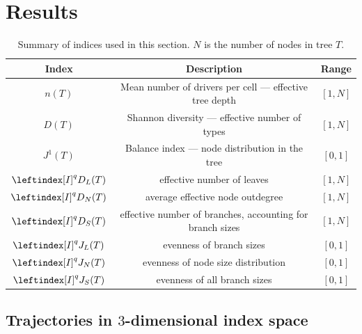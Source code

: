 \section{Results}

\begin{table}[h!]
    \begin{tabular}{|c|c|c|}
        \hline
        Index & Description & Range \\
        \hline
        \hline
        $n(T)$ & Mean number of drivers per cell --- effective tree depth &
        $[1, N]$ \\
        \hline
        $D(T)$ & Shannon diversity --- effective number of types & $[1, N]$ \\
        \hline
        $J^1(T)$ & Balance index --- node distribution in the tree & $[0, 1]$
        \\
        \hline
        $\leftindex[I]^q{D}_L(T)$ & effective number of leaves & $[1, N]$ \\
        \hline
        $\leftindex[I]^q{D}_N(T)$ & average effective node outdegree & $[1, N]$
        \\
        \hline
        $\leftindex[I]^q{D}_S(T)$ & effective number of branches, accounting for
        branch sizes& $[1, N]$ \\
        \hline
        $\leftindex[I]^q{J}_L(T)$ & evenness of branch sizes & $[0, 1]$ \\
        \hline
        $\leftindex[I]^q{J}_N(T)$ & evenness of node size distribution & $[0, 1]$ \\
        \hline
        $\leftindex[I]^q{J}_S(T)$ & evenness of all branch sizes & $[0, 1]$ \\
        \hline
    \end{tabular}
    \caption{Summary of indices used in this section. $N$ is the number of nodes
    in tree $T$.}
    \label{tab:results}
\end{table}

\subsection{Trajectories in $3$-dimensional index space}

